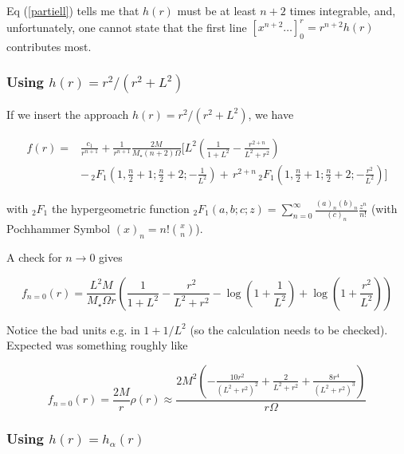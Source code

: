 \documentclass[10pt,a4paper, fleqn]{article}
\begin{document}
Eq (\ref{partiell}) tells me that $h(r)$ must be at least $n+2$ times integrable, and, unfortunately, one cannot state that the first line $[x^{n+2} \dots]^r_0 =  r^{n+2} h(r)$ contributes most.


\subsubsection{Using $h(r) = r^2 / (r^2 + L^2)$}
If we insert the approach  $h(r) = r^2 / (r^2 + L^2)$, we have

\begin{equation}
\begin{aligned}
f(r) = &\frac{c_1}{r^{n+1}} + \frac{1}{r^{n+1}}\frac{2 M}{M_\star (n+2) \Omega } 
\Bigg[ L^2 \left( \frac{1}{1+L^2} - \frac{r^{2+n}}{L^2+r^2} \right)  \\
&- \,  _2F_1\left(1,\frac{n}{2}+1;\frac{n}{2}+2;-\frac{1}{L^2}\right) + \,
  r^{2+n} \, _2F_1\left(1,\frac{n}{2}+1;\frac{n}{2}+2;-\frac{r^2}{L^2}\right) \Bigg]
\end{aligned}
\end{equation}

with $_2F_1$ the hypergeometric function ${}_2F_1(a,b;c;z) = \sum_{n=0}^\infty \frac{(a)_n (b)_n}{(c)_n} \frac{z^n}{n!}$ (with Pochhammer Symbol $(x)_n = n!{x \choose n}$).


A check for $n\to0$ gives

\begin{equation}
f_{n=0}(r) = \frac{L^2 M}{M_\star \Omega r} \left(
\frac{1}{1+L^2} - \frac{r^2}{L^2 + r^2}
- \log\left( 1 + \frac{1}{L^2} \right)
+ \log\left( 1 + \frac{r^2}{L^2} \right)
\right)
\end{equation}

Notice the bad units e.g. in $1+1/L^2$ (so the calculation needs to be checked). Expected was something roughly like

\begin{equation}
f_{n=0}(r) = \frac{2M}{r} \rho(r) \approx
\frac{2 M^2 \left(-\frac{10
   r^2}{\left(L^2+r^2\right)^2}+\frac{2}{L^2+r^2}+\frac{8 r^4}{\left(L^2+r^2\right)^3}\right)}{r \Omega }
\end{equation}


\subsubsection{Using $h(r) = h_\alpha(r)$}
\end{document}
